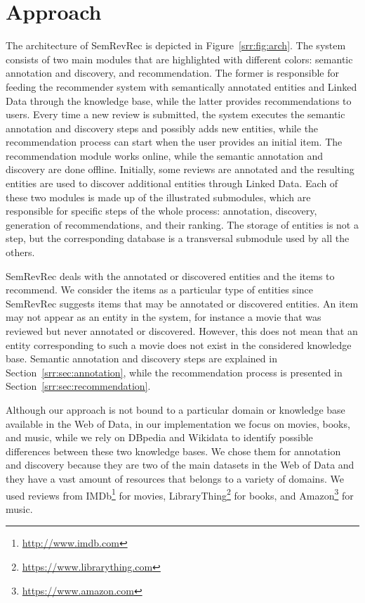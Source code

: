 \section{Approach}
\label{srr:sec:approach}

The architecture of SemRevRec is depicted in Figure~\ref{srr:fig:arch}. The system consists of two main modules that are highlighted with different colors: semantic annotation and discovery, and recommendation. The former is responsible for feeding the recommender system with semantically annotated entities and Linked Data through the knowledge base, while the latter provides recommendations to users. Every time a new review is submitted, the system executes the semantic annotation and discovery steps and possibly adds new entities, while the recommendation process can start when the user provides an initial item. The recommendation module works online, while the semantic annotation and discovery are done offline. Initially, some reviews are annotated and the resulting entities are used to discover additional entities through Linked Data. Each of these two modules is made up of the illustrated submodules, which are responsible for specific steps of the whole process: annotation, discovery, generation of recommendations, and their ranking. The storage of entities is not a step, but the corresponding database is a transversal submodule used by all the others. 

SemRevRec deals with the annotated or discovered entities and the items to recommend. We consider the items as a particular type of entities since SemRevRec suggests items that may be annotated or discovered entities. An item may not appear as an entity in the system, for instance a movie that was reviewed but never annotated or discovered. However, this does not mean that an entity corresponding to such a movie does not exist in the considered knowledge base. Semantic annotation and discovery steps are explained in Section~\ref{srr:sec:annotation}, while the recommendation process is presented in Section~\ref{srr:sec:recommendation}.

Although our approach is not bound to a particular domain or knowledge base available in the Web of Data, in our implementation we focus on movies, books, and music, while we rely on DBpedia and Wikidata to identify possible differences between these two knowledge bases. We chose them for annotation and discovery because they are two of the main datasets in the Web of Data and they have a vast amount of resources that belongs to a variety of domains. We used reviews from IMDb\footnote{\url{http://www.imdb.com}} for movies, LibraryThing\footnote{\url{https://www.librarything.com}} for books, and Amazon\footnote{\url{https://www.amazon.com}} for music.

